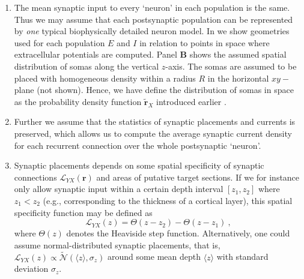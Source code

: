 \begin{enumerate}
\item The mean synaptic input to every `neuron' in each population is the same.
Thus we may assume that each postsynaptic population can be represented by \emph{one} typical biophysically detailed neuron model. 
In  we show geometries used for each population $E$ and $I$ in relation to points in space where extracellular potentials are computed. 
Panel {\bf B} shows the assumed spatial distribution of somas along the vertical $z$-axis. 
The somas are assumed to be placed with homogeneous density within a radius $R$ in the horizontal $xy-$plane (not shown).
Hence, we have define the distribution of somas in space as the probability density function $\widetilde{\mathbf{r}}_X$ introduced earlier 
. 


\item Further we assume that the statistics of synaptic placements and currents is preserved,
which allows us to compute the average synaptic current density for each recurrent connection over the whole postsynaptic `neuron'.  

\item Synaptic placements depends on some spatial specificity of synaptic connections \( \mathcal{L}_{YX}(\mathbf{r}) \) and areas of putative target sections.
If we for instance only allow synaptic input within a certain depth interval $[z_1, z_2]$ where $z_1 < z_2$ (e.g., corresponding to the thickness of a cortical layer),
this spatial specificity function may be defined as
\begin{equation}
\mathcal{L}_{YX}(z) = \Theta(z - z_2) - \Theta(z - z_1) ~,
\end{equation}
where $\Theta(z)$ denotes the Heaviside step function. 
Alternatively, one could assume normal-distributed synaptic placements, that is, 
$\mathcal{L}_{YX}(z)\propto \mathcal{\widetilde{N}}(\langle z \rangle, \sigma_z)$ 
around some mean depth $\langle z \rangle$ with standard deviation $\sigma_z$.


\end{enumerate}
